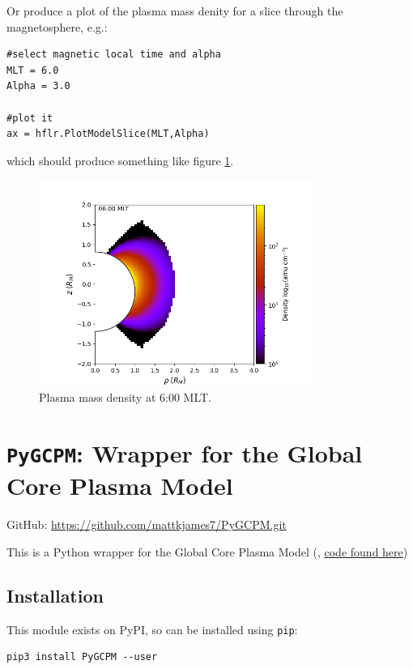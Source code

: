 			Or produce a plot of the plasma mass denity for a slice through the magnetosphere, e.g.:
			\begin{verbatim}
#select magnetic local time and alpha
MLT = 6.0
Alpha = 3.0

#plot it
ax = hflr.PlotModelSlice(MLT,Alpha)
			\end{verbatim}
			which should produce something like figure \ref{FigHFLR}.

			\begin{figure}
				\begin{center}
					\includegraphics[width=0.8\textwidth]{figures/ch2_hflr.png}
				\end{center}
				\caption{Plasma mass density at 6:00 MLT. \label{FigHFLR}}
			\end{figure}



	\section{\texttt{PyGCPM}: Wrapper for the Global Core Plasma Model}
	
		GitHub: \href{https://github.com/mattkjames7/PyGCPM.git}{https://github.com/mattkjames7/PyGCPM.git}

		This is a Python wrapper for the Global Core Plasma Model (\citet{Gallagher2000}, \href{https://plasmasphere.nasa.gov/models/}{code found here})

		\subsection{Installation}

			This module exists on PyPI, so can be installed using \texttt{pip}:
			\begin{verbatim}
pip3 install PyGCPM --user
			\end{verbatim}

